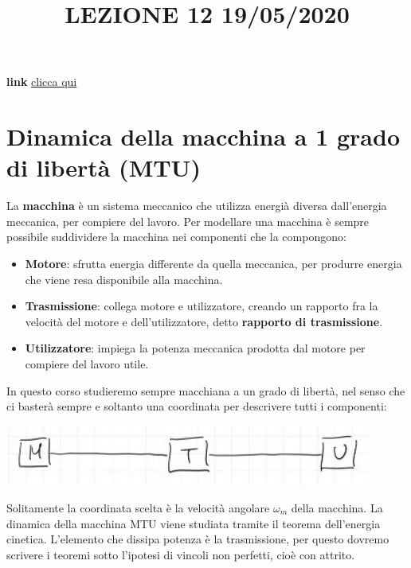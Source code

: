 \title{LEZIONE 12 19/05/2020}\newline
\textbf{link} \href{https://web.microsoftstream.com/video/4108da02-d3de-45e4-ab46-94d93c315e97}{clicca qui}
\section{Dinamica della macchina a 1 grado di libertà (MTU)}
La \textbf{macchina} è un sistema meccanico che utilizza energià diversa dall'energia meccanica, per compiere del lavoro.\newline
\newline
Per modellare una macchina è sempre possibile suddividere la macchina nei componenti che la compongono:
\begin{itemize}
    \item \textbf{Motore}: sfrutta energia differente da quella meccanica, per produrre energia che viene resa disponibile alla macchina.
    \item \textbf{Trasmissione}: collega motore e utilizzatore, creando un rapporto fra la velocità del motore e dell'utilizzatore, detto \textbf{rapporto di trasmissione}.
    \item \textbf{Utilizzatore}: impiega la potenza meccanica prodotta dal motore per compiere del lavoro utile.
\end{itemize}
In questo corso studieremo sempre macchiana a un grado di libertà, nel senso che ci basterà sempre e soltanto una coordinata per descrivere tutti i componenti:
\begin{center}
    \includegraphics[height=2cm]{../lezione12/img1.JPG}
\end{center}
Solitamente la coordinata scelta è la velocità angolare $\omega_m$ della macchina.\newline
\newline
La dinamica della macchina MTU viene studiata tramite il teorema dell'energia cinetica.\newline
\newline
L'elemento che dissipa potenza è la trasmissione, per questo dovremo scrivere i teoremi sotto l'ipotesi di vincoli non perfetti, cioè con attrito.\newline
